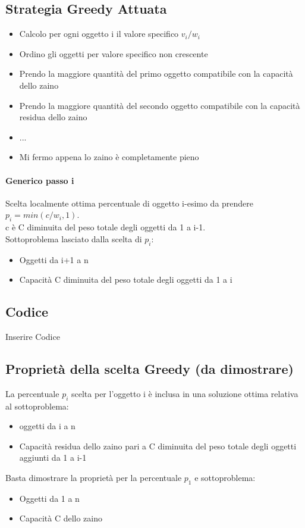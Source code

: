 \subsection{Strategia Greedy Attuata}
\begin{itemize}
    \item Calcolo per ogni oggetto i il valore specifico $v_i/w_i$
    \item Ordino gli oggetti per valore specifico non crescente
    \item Prendo la maggiore quantità del primo oggetto compatibile con la capacità
    dello zaino
    \item Prendo la maggiore quantità del secondo oggetto compatibile con la capacità
    residua dello zaino
    \item ...
    \item Mi fermo appena lo zaino è completamente pieno
\end{itemize}
\paragraph*{Generico passo i} Scelta localmente ottima \ra percentuale di oggetto
i-esimo da prendere $p_i = min(c/w_i,1)$.\\
c è C diminuita del peso totale degli oggetti da 1 a i-1.\\
Sottoproblema lasciato dalla scelta di $p_i$:
\begin{itemize}
    \item Oggetti da i+1 a n
    \item Capacità C diminuita del peso totale degli oggetti da 1 a i
\end{itemize}
\subsection{Codice}
Inserire Codice
\subsection{Proprietà della scelta Greedy (da dimostrare)}
La percentuale $p_i$ scelta per l'oggetto i è inclusa in una soluzione ottima relativa al
sottoproblema:
\begin{itemize}
    \item oggetti da i a n
    \item Capacità residua dello zaino pari a C diminuita del peso totale degli
    oggetti aggiunti da 1 a i-1
\end{itemize}
Basta dimostrare la proprietà per la percentuale $p_1$ e sottoproblema:
\begin{itemize}
    \item Oggetti da 1 a n
    \item Capacità C dello zaino
\end{itemize}
